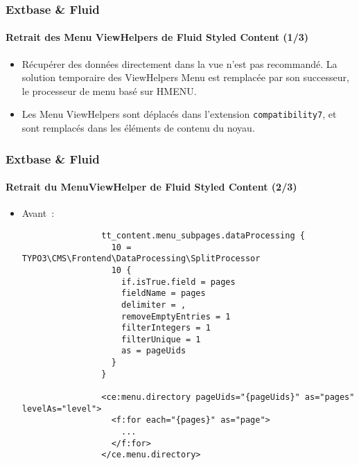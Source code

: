 \begin{frame}[fragile]
	\frametitle{Extbase \& Fluid}
	\framesubtitle{Retrait des Menu ViewHelpers de Fluid Styled Content (1/3)}

	\begin{itemize}
		\item Récupérer des données directement dans la vue n'est pas recommandé.
			La solution temporaire des ViewHelpers Menu est remplacée par son
			successeur, le processeur de menu basé sur HMENU.

		\item Les Menu ViewHelpers sont déplacés dans l'extension \texttt{compatibility7},
			et sont remplacés dans les éléments de contenu du noyau.

	\end{itemize}

\end{frame}


\begin{frame}[fragile]
	\frametitle{Extbase \& Fluid}
	\framesubtitle{Retrait du MenuViewHelper de Fluid Styled Content (2/3)}

	\lstset{basicstyle=\tiny\ttfamily}

	\begin{itemize}

		\item Avant~:

			\begin{lstlisting}
				tt_content.menu_subpages.dataProcessing {
				  10 = TYPO3\CMS\Frontend\DataProcessing\SplitProcessor
				  10 {
				    if.isTrue.field = pages
				    fieldName = pages
				    delimiter = ,
				    removeEmptyEntries = 1
				    filterIntegers = 1
				    filterUnique = 1
				    as = pageUids
				  }
				}

				<ce:menu.directory pageUids="{pageUids}" as="pages" levelAs="level">
				  <f:for each="{pages}" as="page">
				    ...
				  </f:for>
				</ce.menu.directory>
			\end{lstlisting}

	\end{itemize}

\end{frame}

